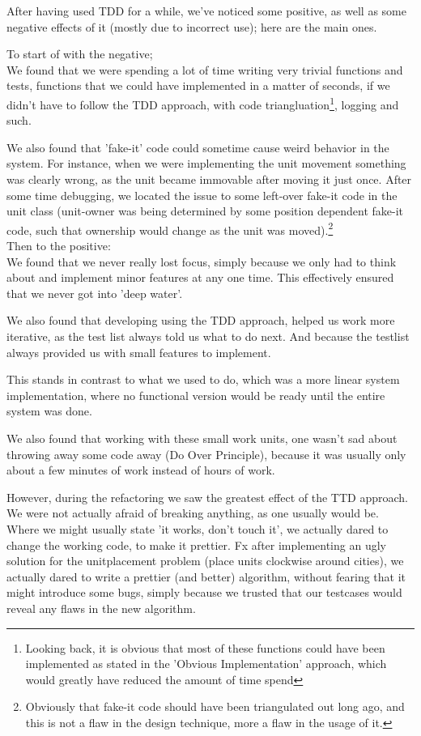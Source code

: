 After having used TDD for a while, we've noticed some positive, as well as some
negative effects of it (mostly due to incorrect use); here are the main ones.

To start of with the negative; \\
We found that we were spending a lot of time writing very trivial functions
and tests,
functions that we could have implemented in a matter of seconds,
if we didn't have to follow the TDD approach, with code triangluation\footnote{Looking back, it is obvious that most of these functions could have been implemented as stated in the 'Obvious Implementation' approach, which would greatly have reduced the amount of time spend}, logging and such.

We also found that 'fake-it' code could sometime cause weird behavior in the
system.
For instance, when we were implementing the unit movement something was
clearly wrong, as the unit became immovable after moving it just once.
After some time debugging, we located the issue to some left-over fake-it code in
the unit class (unit-owner was being determined by some position dependent
fake-it code, such that ownership would change as the unit was moved).\footnote{Obviously that fake-it code should have been triangulated out long ago,
and this is not a flaw in the design technique, more a flaw in the usage of it.} \\

Then to the positive: \\
We found that we never really lost focus, simply because we only had to
think about and implement minor features at any one time. 
This effectively ensured that we never got into 'deep water'.
 
We also found that developing using the TDD approach, helped us work more iterative,
as the test list always told us what to do next.
And because the testlist always provided us with small features to implement. 

This stands in contrast to what we used to do, which was a more linear system implementation, where no functional version would be ready until the entire system was done.

We also found that working with these small work units, one wasn't sad about
throwing away some code away (Do Over Principle), because it was usually only about a few minutes of work instead of hours of work.

However, during the refactoring we saw the greatest effect of
the TTD approach.
We were not actually afraid of breaking anything, as one usually would be.
Where we might usually state 'it works, don't touch it', we actually dared to change the working code, to make it prettier.
Fx after implementing an ugly solution for the unitplacement problem (place units clockwise around cities), we actually dared to write a prettier (and better) algorithm,
without fearing that it might introduce some bugs,
simply because we trusted that our testcases would reveal any flaws in the new algorithm.\\


